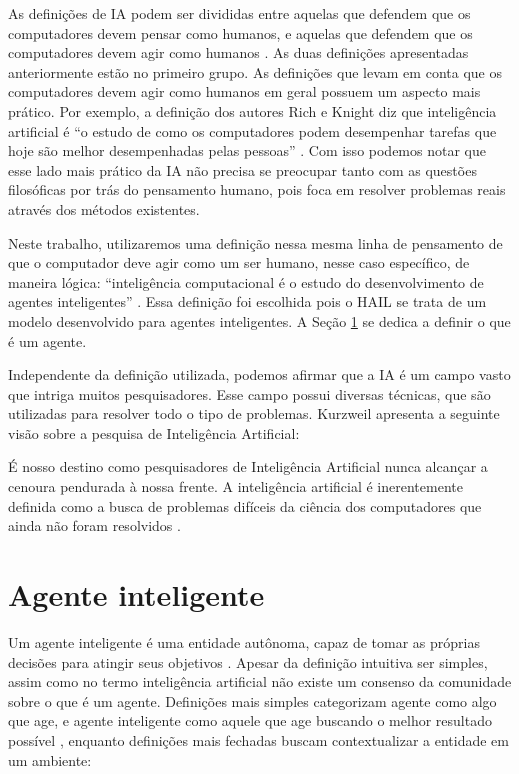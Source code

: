 As definições de IA podem ser divididas entre aquelas que defendem que os computadores devem pensar como humanos, e aquelas que defendem que os computadores devem agir como humanos \cite{russel2013artificial}. As duas definições apresentadas anteriormente estão no primeiro grupo. As definições que levam em conta que os computadores devem agir como humanos em geral possuem um aspecto mais prático. Por exemplo, a definição dos autores Rich e Knight diz que inteligência artificial é ``o estudo de como os computadores podem desempenhar tarefas que hoje são melhor desempenhadas pelas pessoas'' \cite{rich1991artificial}. Com isso podemos notar que esse lado mais prático da IA não precisa se preocupar tanto com as questões filosóficas por trás do pensamento humano, pois foca em resolver problemas reais através dos métodos existentes. 

Neste trabalho, utilizaremos uma definição nessa mesma linha de pensamento de que o computador deve agir como um ser humano, nesse caso específico, de maneira lógica: ``inteligência computacional é o estudo do desenvolvimento de agentes inteligentes'' \cite{poole1998computational}. Essa definição foi escolhida pois o HAIL se trata de um modelo desenvolvido para agentes inteligentes. A Seção \ref{section:agent} se dedica a definir o que é um agente.

Independente da definição utilizada, podemos afirmar que a IA é um campo vasto que intriga muitos pesquisadores. Esse campo possui diversas técnicas, que são utilizadas para resolver todo o tipo de problemas. Kurzweil apresenta a seguinte visão sobre a pesquisa de Inteligência Artificial:

\begin{displayquote}
    É nosso destino como pesquisadores de Inteligência Artificial nunca alcançar a cenoura pendurada à nossa frente. A inteligência artificial é inerentemente definida como a busca de problemas difíceis da ciência dos computadores que ainda não foram resolvidos \cite{kurzweil2000age}.
\end{displayquote}



\section{Agente inteligente}

\label{section:agent}

Um agente inteligente é uma entidade autônoma, capaz de tomar as próprias decisões para atingir seus objetivos \cite{wooldridge1999intelligent}. Apesar da definição intuitiva ser simples, assim como no termo inteligência artificial não existe um consenso da comunidade sobre o que é um agente. Definições mais simples categorizam agente como algo que age, e agente inteligente como aquele que age buscando o melhor resultado possível \cite{russel2013artificial}, enquanto definições mais fechadas buscam contextualizar a entidade em um ambiente:

